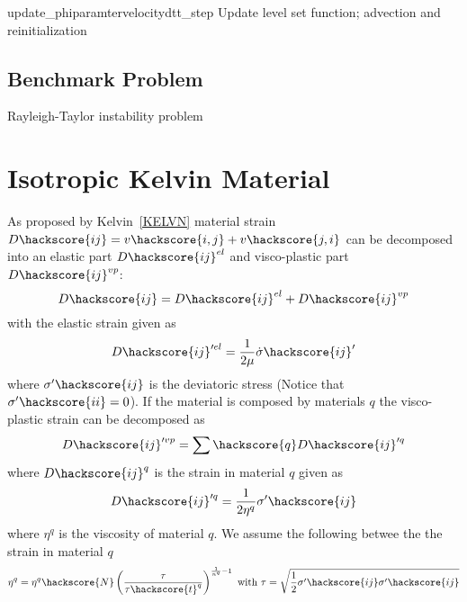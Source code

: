 \begin{methoddesc}[LevelSet]{update\_phi}{paramter}{velocity}{dt}{t\_step}
Update level set function; advection and reinitialization
\end{methoddesc}

\subsection{Benchmark Problem}

Rayleigh-Taylor instability problem



\section{Isotropic Kelvin Material \label{IKM}}
As proposed by Kelvin~\ref{KELVN} material strain $D\hackscore{ij}=v\hackscore{i,j}+v\hackscore{j,i}$ can be decomposed into
an elastic part $D\hackscore{ij}^{el}$ and visco-plastic part $D\hackscore{ij}^{vp}$:
\begin{equation}\label{IKM-EQU-2}
D\hackscore{ij}=D\hackscore{ij}^{el}+D\hackscore{ij}^{vp}
\end{equation}
with the elastic strain given as 
\begin{equation}\label{IKM-EQU-3}
D\hackscore{ij}'^{el}=\frac{1}{2 \mu} \dot{\sigma}\hackscore{ij}'
\end{equation}
where $\sigma'\hackscore{ij}$ is the deviatoric stress (Notice that $\sigma'\hackscore{ii}=0$).
If the material is composed by materials $q$ the visco-plastic strain can be decomposed as
\begin{equation}\label{IKM-EQU-4}
D\hackscore{ij}'^{vp}=\sum\hackscore{q} D\hackscore{ij}'^{q} 
\end{equation}
where $D\hackscore{ij}^{q}$ is the strain in material $q$ given as 
\begin{equation}\label{IKM-EQU-5}
D\hackscore{ij}'^{q}=\frac{1}{2 \eta^{q}} \sigma'\hackscore{ij} 
\end{equation}
where $\eta^{q}$ is the viscosity of material $q$. We assume the following 
betwee the the strain in material $q$ 
\begin{equation}\label{IKM-EQU-5b}
\eta^{q}=\eta^{q}\hackscore{N} \left(\frac{\tau}{\tau\hackscore{t}^q}\right)^{\frac{1}{n^{q}}-1}
\mbox{ with } \tau=\sqrt{\frac{1}{2}\sigma'\hackscore{ij} \sigma'\hackscore{ij}}
\end{equation}

